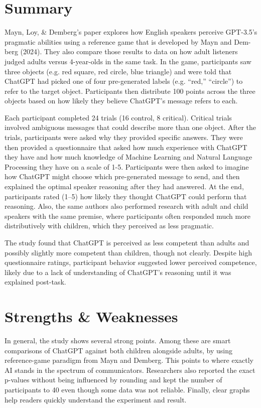 \documentclass[12pt]{article}
\begin{document}
\section{Summary}
Mayn, Loy, \& Demberg's paper explores how English speakers perceive GPT-3.5’s pragmatic abilities using a reference game that is developed by Mayn and Dem-berg (2024). They also compare those results to data on how adult listeners judged adults versus 4-year-olds in the same task. In the game, participants saw three objects (e.g. red square, red circle, blue triangle) and were told that ChatGPT had picked one of four pre-generated labels (e.g. “red,” “circle”) to refer to the target object. Participants then distribute 100 points across the three objects based on how likely they believe ChatGPT’s message refers to each.

Each participant completed 24 trials (16 control, 8 critical). Critical trials involved ambiguous messages that could describe more than one object. After the trials, participants were asked why they provided specific answers. They were then provided a questionnaire that asked how much experience with ChatGPT they have and how much knowledge of Machine Learning and Natural Language Processing they have on a scale of 1-5. Participants were then asked to imagine how ChatGPT might choose which pre-generated message to send, and then explained the optimal speaker reasoning after they had answered. At the end, participants rated (1–5) how likely they thought ChatGPT could perform that reasoning. Also, the same authors also performed research with adult and child speakers with the same premise, where participants often responded much more distributively with children, which they perceived as less pragmatic.


The study found that ChatGPT is perceived as less competent than adults and possibly slightly more competent than children, though not clearly. Despite high questionnaire ratings, participant behavior suggested lower perceived competence, likely due to a lack of understanding of ChatGPT’s reasoning until it was explained post-task.


\section{Strengths \& Weaknesses}
In general, the study shows several strong points. Among these are smart comparisons of ChatGPT against both children alongside adults, by using reference-game paradigm from Mayn and Demberg. This points to where exactly AI stands in the spectrum of communicators. Researchers also reported the exact p-values without being influenced by rounding and kept the number of participants to 40 even though some data was not reliable. Finally, clear graphs help readers quickly understand the experiment and result.
\end{document}
